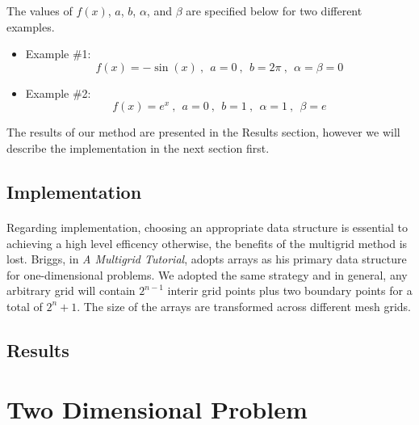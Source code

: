 \documentclass[pdftex,12pt,a4paper]{article}
\begin{document}
    The values of $f(x)$, $a$, $b$, $\alpha$, and $\beta$ are specified below for two different examples. \\
    \begin{itemize}
        \item Example \#1: 
            \begin{equation*}
                f(x) = -\sin(x) ~ , ~~ a = 0 ~ , ~~ b = 2 \pi ~ , ~~ \alpha = \beta = 0
            \end{equation*}
        \item Example \#2: 
            \begin{equation*}
                f(x) = e^x ~ , ~~ a = 0 ~ , ~~ b = 1 ~ , ~~ \alpha = 1 ~ , ~~ \beta = e
            \end{equation*}
    \end{itemize}
    The results of our method are presented in the Results section, however we will describe the implementation in the next section first.

    \subsection{Implementation}   

        \paragraph*{} Regarding implementation, choosing an appropriate data structure is essential to achieving a high level efficency otherwise, the benefits of the multigrid method is lost.  Briggs, in \textit{A Multigrid Tutorial}, adopts arrays as his primary data structure for one-dimensional problems.  We adopted the same strategy and in general, any arbitrary grid will contain $2^{n-1}$ interir grid points plus two boundary points for a total of $2^{n}+1$.  The size of the arrays are transformed across different mesh grids.  

    \subsection{Results}
        \paragraph*{}

\section{Two Dimensional Problem}
    
\end{document}
